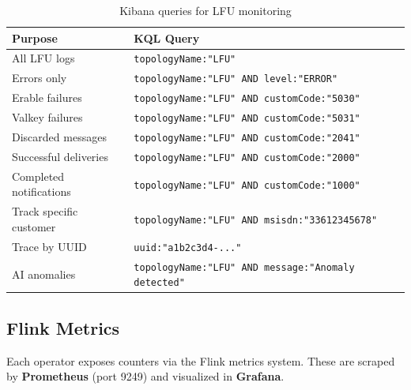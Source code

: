 \begin{table}[H]
    \centering
    \caption{Kibana queries for LFU monitoring}
    \label{tab:kibana-queries}
    \begin{tabularx}{\textwidth}{l X}
\toprule
\textbf{Purpose} & \textbf{KQL Query} \\
\midrule
All LFU logs & \texttt{topologyName:"LFU"} \\
Errors only & \texttt{topologyName:"LFU" AND level:"ERROR"} \\
Erable failures & \texttt{topologyName:"LFU" AND customCode:"5030"} \\
Valkey failures & \texttt{topologyName:"LFU" AND customCode:"5031"} \\
Discarded messages & \texttt{topologyName:"LFU" AND customCode:"2041"} \\
Successful deliveries & \texttt{topologyName:"LFU" AND customCode:"2000"} \\
Completed notifications & \texttt{topologyName:"LFU" AND customCode:"1000"} \\
Track specific customer & \texttt{topologyName:"LFU" AND msisdn:"33612345678"} \\
Trace by UUID & \texttt{uuid:"a1b2c3d4-..."} \\
AI anomalies & \texttt{topologyName:"LFU" AND message:"Anomaly detected"} \\
\bottomrule
    \end{tabularx}
\end{table}

\subsection{Flink Metrics}

Each operator exposes counters via the Flink metrics system. These are scraped by \textbf{Prometheus} (port 9249) and visualized in \textbf{Grafana}.

